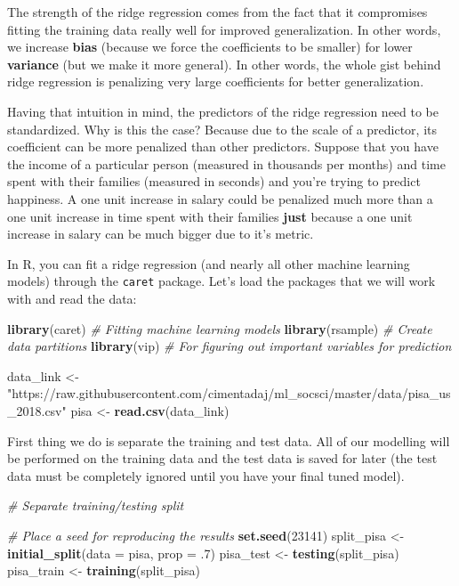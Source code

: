 \documentclass[
]{book}
\newenvironment{Shaded}{\begin{snugshade}}{\end{snugshade}}
\newcommand{\CommentTok}[1]{\textcolor[rgb]{0.56,0.35,0.01}{\textit{#1}}}
\newcommand{\DataTypeTok}[1]{\textcolor[rgb]{0.13,0.29,0.53}{#1}}
\newcommand{\DecValTok}[1]{\textcolor[rgb]{0.00,0.00,0.81}{#1}}
\newcommand{\FloatTok}[1]{\textcolor[rgb]{0.00,0.00,0.81}{#1}}
\newcommand{\KeywordTok}[1]{\textcolor[rgb]{0.13,0.29,0.53}{\textbf{#1}}}
\newcommand{\NormalTok}[1]{#1}
\newcommand{\StringTok}[1]{\textcolor[rgb]{0.31,0.60,0.02}{#1}}
\begin{document}
The strength of the ridge regression comes from the fact that it compromises fitting the training data really well for improved generalization. In other words, we increase \textbf{bias} (because we force the coefficients to be smaller) for lower \textbf{variance} (but we make it more general). In other words, the whole gist behind ridge regression is penalizing very large coefficients for better generalization.

Having that intuition in mind, the predictors of the ridge regression need to be standardized. Why is this the case? Because due to the scale of a predictor, its coefficient can be more penalized than other predictors. Suppose that you have the income of a particular person (measured in thousands per months) and time spent with their families (measured in seconds) and you're trying to predict happiness. A one unit increase in salary could be penalized much more than a one unit increase in time spent with their families \textbf{just} because a one unit increase in salary can be much bigger due to it's metric.

In R, you can fit a ridge regression (and nearly all other machine learning models) through the \texttt{caret} package. Let's load the packages that we will work with and read the data:

\begin{Shaded}
\begin{Highlighting}[]
\KeywordTok{library}\NormalTok{(caret) }\CommentTok{# Fitting machine learning models}
\KeywordTok{library}\NormalTok{(rsample) }\CommentTok{# Create data partitions}
\KeywordTok{library}\NormalTok{(vip) }\CommentTok{# For figuring out important variables for prediction}

\NormalTok{data_link <-}\StringTok{ "https://raw.githubusercontent.com/cimentadaj/ml_socsci/master/data/pisa_us_2018.csv"}
\NormalTok{pisa <-}\StringTok{ }\KeywordTok{read.csv}\NormalTok{(data_link)}
\end{Highlighting}
\end{Shaded}

First thing we do is separate the training and test data. All of our modelling will be performed on the training data and the test data is saved for later (the test data must be completely ignored until you have your final tuned model).

\begin{Shaded}
\begin{Highlighting}[]
\CommentTok{# Separate training/testing split}

\CommentTok{# Place a seed for reproducing the results}
\KeywordTok{set.seed}\NormalTok{(}\DecValTok{23141}\NormalTok{)}
\NormalTok{split_pisa <-}\StringTok{ }\KeywordTok{initial_split}\NormalTok{(}\DataTypeTok{data =}\NormalTok{ pisa, }\DataTypeTok{prop =} \FloatTok{.7}\NormalTok{)}
\NormalTok{pisa_test <-}\StringTok{ }\KeywordTok{testing}\NormalTok{(split_pisa)}
\NormalTok{pisa_train <-}\StringTok{ }\KeywordTok{training}\NormalTok{(split_pisa)}
\end{Highlighting}
\end{Shaded}
\end{document}
